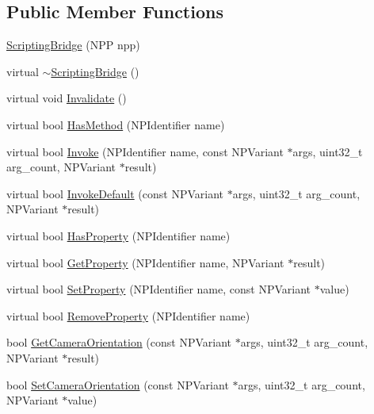 \subsection*{Public Member Functions}
\begin{DoxyCompactItemize}
\item 
\hyperlink{classtumbler_1_1_scripting_bridge_ae743ff1b8ffce6889a86a73500fd0da1}{ScriptingBridge} (NPP npp)
\item 
virtual \hyperlink{classtumbler_1_1_scripting_bridge_ae6c311b5f9ffa0a578c7d8e41fa9c23c}{$\sim$ScriptingBridge} ()
\item 
virtual void \hyperlink{classtumbler_1_1_scripting_bridge_af00ea5a26438b33f976734a3432dfa9b}{Invalidate} ()
\item 
virtual bool \hyperlink{classtumbler_1_1_scripting_bridge_a1d614bb3696baef7c46332426ab7a0dc}{HasMethod} (NPIdentifier name)
\item 
virtual bool \hyperlink{classtumbler_1_1_scripting_bridge_ad18d2af321b2cba1235876cf281295df}{Invoke} (NPIdentifier name, const NPVariant $\ast$args, uint32\_\-t arg\_\-count, NPVariant $\ast$result)
\item 
virtual bool \hyperlink{classtumbler_1_1_scripting_bridge_a2cee828951db15b4cce1074e934c4f97}{InvokeDefault} (const NPVariant $\ast$args, uint32\_\-t arg\_\-count, NPVariant $\ast$result)
\item 
virtual bool \hyperlink{classtumbler_1_1_scripting_bridge_aeed261c756896802f26632acfceba1d7}{HasProperty} (NPIdentifier name)
\item 
virtual bool \hyperlink{classtumbler_1_1_scripting_bridge_afef889fc2ff5ccabefb713cf7ad5e056}{GetProperty} (NPIdentifier name, NPVariant $\ast$result)
\item 
virtual bool \hyperlink{classtumbler_1_1_scripting_bridge_ae73ff0ec0f70dfcd0e22534c8281f3e3}{SetProperty} (NPIdentifier name, const NPVariant $\ast$value)
\item 
virtual bool \hyperlink{classtumbler_1_1_scripting_bridge_a861437163b8291eb7b302ce8f778022d}{RemoveProperty} (NPIdentifier name)
\item 
bool \hyperlink{classtumbler_1_1_scripting_bridge_a95b4a3ee287861d23021bfae7b7c1b08}{GetCameraOrientation} (const NPVariant $\ast$args, uint32\_\-t arg\_\-count, NPVariant $\ast$result)
\item 
bool \hyperlink{classtumbler_1_1_scripting_bridge_a9e581cb6e3f5ee07dbd818f0ee3dbb4d}{SetCameraOrientation} (const NPVariant $\ast$args, uint32\_\-t arg\_\-count, NPVariant $\ast$value)
\end{DoxyCompactItemize}
